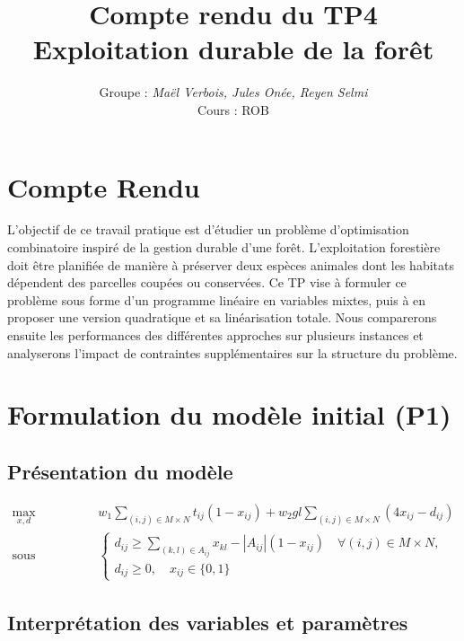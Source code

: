 \documentclass[a4paper,11pt]{article}
\title{\textbf{Compte rendu du TP4}\\[4pt]
\large Exploitation durable de la forêt}
\author{Groupe : \textit{Maël Verbois, Jules Onée, Reyen Selmi} \\[2pt] Cours : ROB}
\begin{document}
\maketitle

\section{Compte Rendu}
L’objectif de ce travail pratique est d’étudier un problème d’optimisation combinatoire inspiré de la gestion durable d’une forêt. 
L’exploitation forestière doit être planifiée de manière à préserver deux espèces animales dont les habitats dépendent des parcelles coupées ou conservées. 
Ce TP vise à formuler ce problème sous forme d’un programme linéaire en variables mixtes, puis à en proposer une version quadratique et sa linéarisation totale. 
Nous comparerons ensuite les performances des différentes approches sur plusieurs instances et analyserons l’impact de contraintes supplémentaires sur la structure du problème.

\section{Formulation du modèle initial (P1)}
\subsection{Présentation du modèle}


\[
\begin{aligned}
\max_{x,d} \quad & w_1 \sum_{(i,j)\in M\times N} t_{ij}(1 - x_{ij}) + w_2 g l \sum_{(i,j)\in M\times N} (4x_{ij} - d_{ij}) \\
\text{sous contraintes} \quad &
\begin{cases}
d_{ij} \ge \sum_{(k,l)\in A_{ij}} x_{kl} - |A_{ij}|(1 - x_{ij}) \quad \forall (i,j)\in M\times N,\\[8pt]
d_{ij} \ge 0, \quad x_{ij}\in \{0,1\}
\end{cases}
\end{aligned}
\]

\subsection{Interprétation des variables et paramètres}
\end{document}
